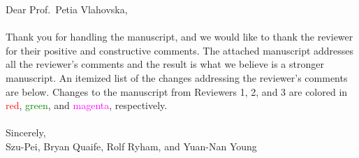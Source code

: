 \documentclass[11pt]{article}
\begin{document}
\noindent
Dear Prof.~Petia Vlahovska,
\\ \\
\noindent
Thank you for handling the manuscript, and we would like to thank the
reviewer for their positive and constructive comments. The attached
manuscript addresses all the reviewer's comments and the result is what
we believe is a stronger manuscript. An itemized list of the changes
addressing the reviewer's comments are below. Changes to the manuscript
from Reviewers 1, 2, and 3 are colored in \textcolor{red}{red},
\textcolor{green}{green}, and \textcolor{magenta}{magenta},
respectively. \\ \\
\noindent
Sincerely,
\\
\noindent
Szu-Pei, Bryan Quaife, Rolf Ryham, and Yuan-Nan Young
\end{document}
